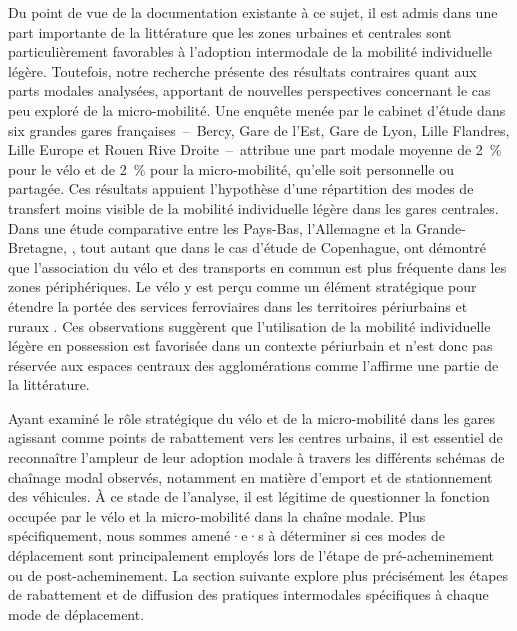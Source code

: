 \begin{refsegment}
Du point de vue de la documentation existante à ce sujet, il est admis dans une part importante de la littérature que les zones urbaines et centrales sont particulièrement favorables à l'adoption intermodale de la mobilité individuelle légère. Toutefois, notre recherche présente des résultats contraires quant aux parts modales analysées, apportant de nouvelles perspectives concernant le cas peu exploré de la micro-mobilité. Une enquête menée par le cabinet d'étude \textcolor{blue}{\textcite[18]{enov_enquete_2021}} dans six grandes gares françaises~–~Bercy, Gare de l'Est, Gare de Lyon, Lille Flandres, Lille Europe et Rouen Rive Droite~–~attribue une part modale moyenne de 2~\% pour le vélo et de 2~\% pour la micro-mobilité, qu'elle soit personnelle ou partagée. Ces résultats appuient l'hypothèse d'une répartition des modes de transfert moins visible de la mobilité individuelle légère dans les gares centrales. Dans une étude comparative entre les Pays-Bas, l'Allemagne et la Grande-Bretagne, \textcolor{blue}{\textcite[291]{martens_bicycle_2004}}, tout autant que \textcolor{blue}{\textcite[25]{halldorsdottir_home-end_2017}} dans le cas d'étude de Copenhague, ont démontré que l'association du vélo et des transports en commun est plus fréquente dans les zones périphériques. Le vélo y est perçu comme un élément stratégique pour étendre la portée des services ferroviaires dans les territoires périurbains et ruraux \textcolor{blue}{\autocite[86]{zuo_incorporating_2021}}. Ces observations suggèrent que l'utilisation de la mobilité individuelle légère en possession est favorisée dans un contexte périurbain \textcolor{blue}{\autocite[38]{stransky_periurbain_2019}} et n'est donc pas réservée aux espaces centraux des agglomérations comme l'affirme une partie de la littérature.%

Ayant examiné le rôle stratégique du vélo et de la micro-mobilité dans les gares agissant comme points de rabattement vers les centres urbains, il est essentiel de reconnaître l'ampleur de leur adoption modale à travers les différents schémas de chaînage modal observés, notamment en matière d'emport et de stationnement des véhicules. À ce stade de l'analyse, il est légitime de questionner la fonction occupée par le vélo et la micro-mobilité dans la chaîne modale. Plus spécifiquement, nous sommes amené·e·s à déterminer si ces modes de déplacement sont principalement employés lors de l'étape de pré-acheminement ou de post-acheminement. La section suivante explore plus précisément les étapes de rabattement et de diffusion des pratiques intermodales spécifiques à chaque mode de déplacement.%


\end{refsegment}
